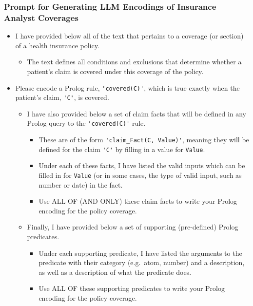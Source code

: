 \subsubsection{Prompt for Generating LLM Encodings of Insurance Analyst Coverages}
\label{app:art-prompt}
\begin{itemize}
  \item I have provided below all of the text that pertains to a coverage (or section) 
        of a health insurance policy.
    \begin{itemize}
      \item The text defines all conditions and exclusions that determine 
            whether a patient's claim is covered under this coverage of the policy.
    \end{itemize}

  \item Please encode a Prolog rule, \verb|'covered(C)'|, which is true 
        exactly when the patient's claim, \verb|'C'|, is covered.
    \begin{itemize}
      \item I have also provided below a set of claim facts that will be 
            defined in any Prolog query to the \verb|'covered(C)'| rule.
        \begin{itemize}
          \item These are of the form 
                \verb|'claim_Fact(C, Value)'|, meaning they will be defined for 
                the claim \verb|'C'| by filling in a value for \verb|Value|.
          \item Under each of these facts, I have listed the valid inputs which 
                can be filled in for \verb|Value| (or in some cases, the type of 
                valid input, such as number or date) in the fact.
          \item Use ALL OF (AND ONLY) these claim facts to write your 
                Prolog encoding for the policy coverage.
        \end{itemize}

      \item Finally, I have provided below a set of supporting (pre-defined) 
            Prolog predicates.
        \begin{itemize}
          \item Under each supporting predicate, I have listed the arguments to 
                the predicate with their category (e.g.\ atom, number) and a 
                description, as well as a description of what the predicate does.
          \item Use ALL OF these supporting predicates to write your 
                Prolog encoding for the policy coverage.
        \end{itemize}
    \end{itemize}


\end{itemize}
